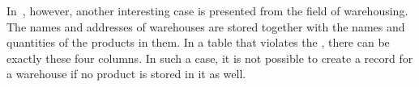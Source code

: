 In~\cite{K1983ASGTFNFIRDT}, however, another interesting case is presented from the field of warehousing.
The names and addresses of warehouses are stored together with the names and quantities of the products in them.
In a table that violates the , there can be exactly these four columns.
In such a case, it is not possible to create a record for a warehouse if no product is stored in it as well.%
%
\FloatBarrier%
\endhsection%
%
